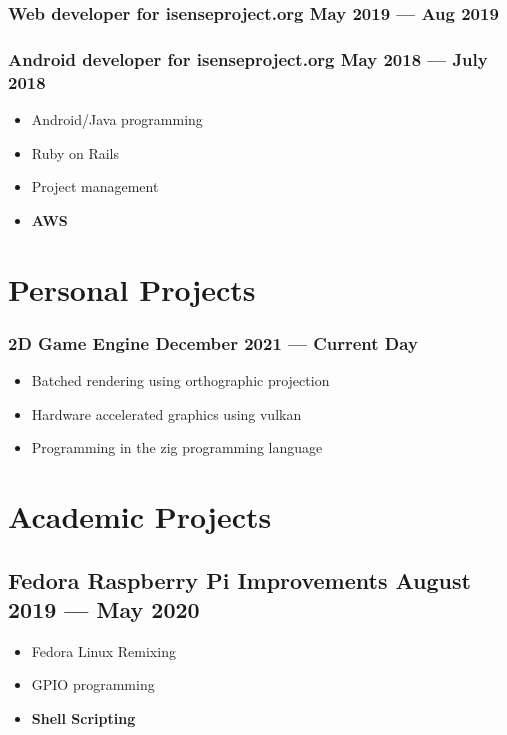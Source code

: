 \documentclass[11pt]{article}
\begin{document}
\subsubsection{Web developer for isenseproject.org\hspace*{\fill} May 2019 --- Aug 2019}
\subsubsection{Android developer for isenseproject.org\hspace*{\fill} May 2018 --- July 2018}
\begin{itemize}[noitemsep, topsep=0pt]
	\item[] Android/Java programming
	\item[] Ruby on Rails
	\item[] Project management
	\item[] {\bf AWS}
\end{itemize}

\section{Personal Projects}

\subsubsection{{\bf 2D Game Engine}\hspace*{\fill} December 2021 --- Current Day}
\begin{itemize}[noitemsep, topsep=0pt]
	\item[] Batched rendering using orthographic projection
	\item[] Hardware accelerated graphics using vulkan
	\item[] Programming in the zig programming language
\end{itemize}

\section{Academic Projects}

\subsection{{\bf Fedora Raspberry Pi Improvements}\hspace*{\fill} August 2019 --- May 2020 }
\begin{itemize}[noitemsep, topsep=0pt]
	\item[] Fedora Linux Remixing
	\item[] GPIO programming
	\item[] {\bf Shell Scripting}
\end{itemize}
\end{document}
